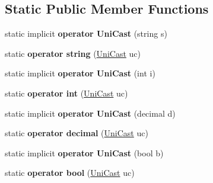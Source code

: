\subsection*{Static Public Member Functions}
\begin{DoxyCompactItemize}
\item 
\mbox{\label{class_lerp2_a_p_i_1_1_game_1_1_uni_cast_ab3b5eb0c54661436e241a6bda08ba6b0}} 
static implicit {\bfseries operator Uni\+Cast} (string s)
\item 
\mbox{\label{class_lerp2_a_p_i_1_1_game_1_1_uni_cast_adeb426aa8782266b73a31040d22247b7}} 
static {\bfseries operator string} (\hyperlink{class_lerp2_a_p_i_1_1_game_1_1_uni_cast}{Uni\+Cast} uc)
\item 
\mbox{\label{class_lerp2_a_p_i_1_1_game_1_1_uni_cast_a922fc21d251c23204822693c8e61cdbe}} 
static implicit {\bfseries operator Uni\+Cast} (int i)
\item 
\mbox{\label{class_lerp2_a_p_i_1_1_game_1_1_uni_cast_af143476a40b64b1a503abd8532213197}} 
static {\bfseries operator int} (\hyperlink{class_lerp2_a_p_i_1_1_game_1_1_uni_cast}{Uni\+Cast} uc)
\item 
\mbox{\label{class_lerp2_a_p_i_1_1_game_1_1_uni_cast_aba4cc688c14d2d72d4e27bdc6228300d}} 
static implicit {\bfseries operator Uni\+Cast} (decimal d)
\item 
\mbox{\label{class_lerp2_a_p_i_1_1_game_1_1_uni_cast_a2782d1b407078b98690a2cebf3d57d2a}} 
static {\bfseries operator decimal} (\hyperlink{class_lerp2_a_p_i_1_1_game_1_1_uni_cast}{Uni\+Cast} uc)
\item 
\mbox{\label{class_lerp2_a_p_i_1_1_game_1_1_uni_cast_ae717aec495e87ed6c8c18f050c9804b6}} 
static implicit {\bfseries operator Uni\+Cast} (bool b)
\item 
\mbox{\label{class_lerp2_a_p_i_1_1_game_1_1_uni_cast_a6d5fd929df01248a2ed22391713691a5}} 
static {\bfseries operator bool} (\hyperlink{class_lerp2_a_p_i_1_1_game_1_1_uni_cast}{Uni\+Cast} uc)
\end{DoxyCompactItemize}
